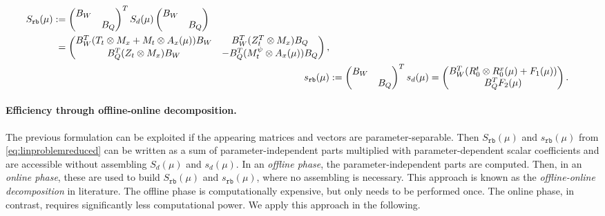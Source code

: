 \documentclass{article}
\theoremstyle{plain}
\theoremstyle{definition}
\theoremstyle{remark}
\begin{document}
\begin{align}
\begin{split}
    S_\texttt{rb}(\mu) &:= \begin{pmatrix}B_W & \\ & B_Q\end{pmatrix}^T S_d(\mu) \begin{pmatrix}B_W & \\ & B_Q\end{pmatrix} \\&\hphantom{:}= \begin{pmatrix} B_W^T (T_t \otimes M_x + M_t \otimes A_x(\mu)) B_W & B_W^T (Z_t^T \otimes M_x) B_Q \\
    B_Q^T (Z_t \otimes M_x) B_W & -B_Q^T(M_t^\psi \otimes A_x(\mu))B_Q
    \end{pmatrix},\end{split}
    \\
    s_\texttt{rb}(\mu) &:= \begin{pmatrix}B_W & \\ & B_Q\end{pmatrix}^T s_d(\mu) = \begin{pmatrix} B_W^T (R_0^t \otimes R_0^x(\mu) + F_1(\mu)) \\ B_Q^T F_2(\mu)
    \end{pmatrix} .
\end{align}

\paragraph*{Efficiency through offline-online decomposition.} The previous formulation can be exploited if the appearing matrices and vectors are parameter-separable. Then $S_\texttt{rb}(\mu)$ and $s_\texttt{rb}(\mu)$ from \eqref{eq:linproblemreduced} can be written as a sum of parameter-independent parts multiplied with parameter-dependent scalar coefficients and are accessible without assembling $S_d(\mu)$ and $s_d(\mu)$. In an \textit{offline phase}, the parameter-independent parts are computed. Then, in an \textit{online phase}, these are used to build $S_\texttt{rb}(\mu)$ and $s_\texttt{rb}(\mu)$, where no assembling is necessary. This approach is known as the \textit{offline-online decomposition} in literature. The offline phase is computationally expensive, but only needs to be performed once. The online phase, in contrast, requires significantly less computational power. We apply this approach in the following.\\
\end{document}

